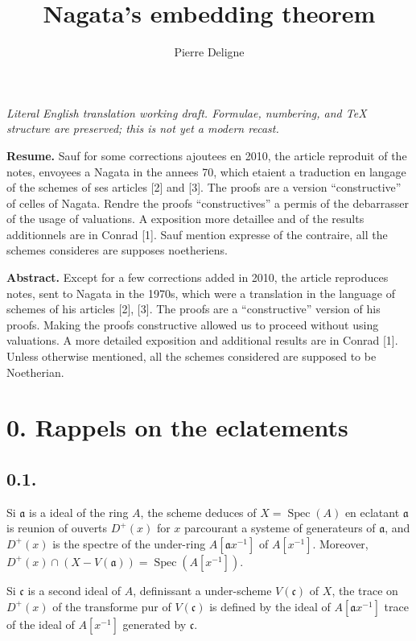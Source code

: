 \documentclass[11pt,a4paper]{article}
\title{Nagata's embedding theorem}
\author{Pierre Deligne}
\date{}
\theoremstyle{plain}
\theoremstyle{definition}
\DeclareMathOperator{\Spec}{Spec}
\begin{document}
\begin{center}\small\emph{Literal English translation working draft. Formulae, numbering, and TeX structure are preserved; this is not yet a modern recast.}\end{center}
\vspace{0.5em}


\maketitle

\noindent\textbf{Resume.} Sauf for some corrections ajoutees en 2010, the article reproduit of the notes, envoyees a Nagata in the annees 70, which etaient a traduction en langage of the schemes of ses articles [2] and [3]. The proofs are a version ``constructive'' of celles of Nagata. Rendre the proofs ``constructives'' a permis of the debarrasser of the usage of valuations. A exposition more detaillee and of the results additionnels are in Conrad [1]. Sauf mention expresse of the contraire, all the schemes consideres are supposes noetheriens.

\bigskip
\noindent\textbf{Abstract.} Except for a few corrections added in 2010, the article reproduces notes, sent to Nagata in the 1970s, which were a translation in the language of schemes of his articles [2], [3]. The proofs are a ``constructive'' version of his proofs. Making the proofs constructive allowed us to proceed without using valuations. A more detailed exposition and additional results are in Conrad [1]. Unless otherwise mentioned, all the schemes considered are supposed to be Noetherian.

\section*{0. Rappels on the eclatements}

\subsection*{0.1.}

Si $\mathfrak{a}$ is a ideal of the ring $A$, the scheme deduces of $X = \Spec(A)$ en eclatant $\mathfrak{a}$ is reunion of ouverts $D^+(x)$ for $x$ parcourant a systeme of generateurs of $\mathfrak{a}$, and $D^+(x)$ is the spectre of the under-ring $A[\mathfrak{a}x^{-1}]$ of $A[x^{-1}]$. Moreover, $D^+(x) \cap (X - V(\mathfrak{a})) = \Spec(A[x^{-1}])$.

Si $\mathfrak{c}$ is a second ideal of $A$, definissant a under-scheme $V(\mathfrak{c})$ of $X$, the trace on $D^+(x)$ of the transforme pur of $V(\mathfrak{c})$ is defined by the ideal of $A[\mathfrak{a}x^{-1}]$ trace of the ideal of $A[x^{-1}]$ generated by $\mathfrak{c}$.
\end{document}
